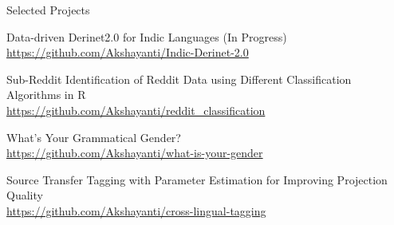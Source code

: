 \documentclass{resume}
\begin{document}

\begin{rSection}{Selected Projects}

    {Data-driven Derinet2.0 for Indic Languages (In Progress)}\\
        \url{https://github.com/Akshayanti/Indic-Derinet-2.0}

    {Sub-Reddit Identification of Reddit Data using Different Classification Algorithms in R}\\
        \url{https://github.com/Akshayanti/reddit_classification}

    {What's Your Grammatical Gender?}\\
        \url{https://github.com/Akshayanti/what-is-your-gender}

    {Source Transfer Tagging with Parameter Estimation for Improving Projection Quality}\\
        \url{https://github.com/Akshayanti/cross-lingual-tagging}

\end{rSection}


\end{document}

